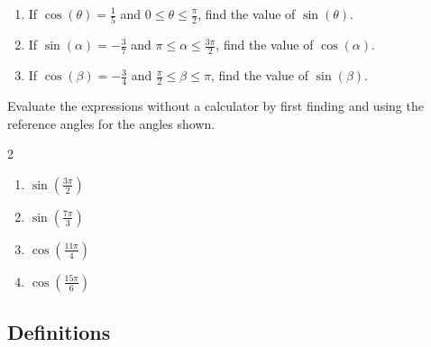 \newpage

\begin{myPractice}
	\begin{enumerate}
		\item If $\cos(\theta)=\frac{1}{5}$ and $0\le\theta\le\frac{\pi}{2}$, find the value of $\sin(\theta)$.
		\vfill
		\item If $\sin(\alpha)=-\frac{3}{7}$ and $\pi\le\alpha\le\frac{3\pi}{2}$, find the value of $\cos(\alpha)$.
		\vfill
		\item If $\cos(\beta)=-\frac{3}{4}$ and $\frac{\pi}{2}\le\beta\le\pi$, find the value of $\sin(\beta)$.
		\vfill
	\end{enumerate}
\end{myPractice}

\begin{myPractice}
	Evaluate the expressions without a calculator by first finding and using the reference angles for the angles shown. 
	\begin{multicols}{2}
		\begin{enumerate}
			\item $\sin(\frac{3\pi}{2})$
			\vspace{2cm}
			\item $\sin(\frac{7\pi}{3})$
			\vfill
			\item $\cos(\frac{11\pi}{4})$
			\vspace{2cm}
			\item $\cos(\frac{15\pi}{6})$
			\vfill
		\end{enumerate}
	\end{multicols}
\end{myPractice}
\vfill

\newpage
\subsection*{Definitions} \label{definitions-section-unit-circle}


